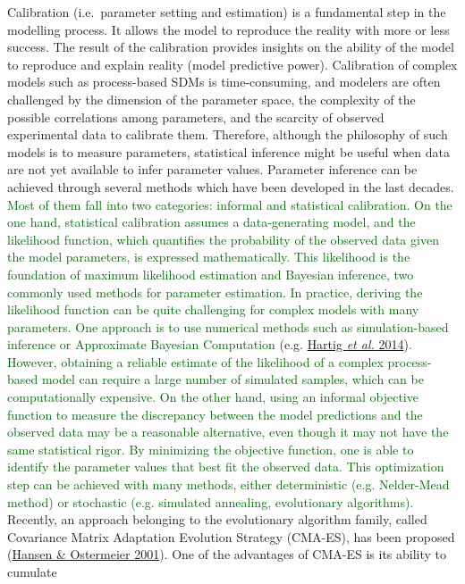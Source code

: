 \documentclass[11pt,]{article}
\begin{document}
Calibration (i.e.~parameter setting and estimation) is a fundamental
step in the modelling process. It allows the model to reproduce the
reality with more or less success. The result of the calibration
provides insights on the ability of the model to reproduce and explain
reality (model predictive power). Calibration of complex models such as
process-based SDMs is time-consuming, and modelers are often challenged
by the dimension of the parameter space, the complexity of the possible
correlations among parameters, and the scarcity of observed experimental
data to calibrate them. Therefore, although the philosophy of such
models is to measure parameters, statistical inference might be useful
when data are not yet available to infer parameter values. Parameter
inference can be achieved through several methods which have been
developed in the last decades.
\textcolor{darkgreen}{Most of them fall into two categories: informal and statistical calibration. On the one hand, statistical calibration assumes a data-generating model, and the likelihood function, which quantifies the probability of the observed data given the model parameters, is expressed mathematically. This likelihood is the foundation of maximum likelihood estimation and Bayesian inference, two commonly used methods for parameter estimation. In practice, deriving the likelihood function can be quite challenging for complex models with many parameters. One approach is to use numerical methods such as simulation-based inference or Approximate Bayesian Computation}
(e.g. \protect\hyperlink{ref-Hartig2014}{Hartig \emph{et al.}
2014})\textcolor{darkgreen}{. However, obtaining a reliable estimate of the likelihood of a complex process-based model can require a large number of simulated samples, which can be computationally expensive. On the other hand, using an informal objective function to measure the discrepancy between the model predictions and the observed data may be a reasonable alternative, even though it may not have the same statistical rigor. By minimizing the objective function, one is able to identify the parameter values that best fit the observed data. This optimization step can be achieved with many methods, either deterministic (e.g. Nelder-Mead method) or stochastic (e.g. simulated annealing, evolutionary algorithms).}\\
Recently, an approach belonging to the evolutionary algorithm family,
called Covariance Matrix Adaptation Evolution Strategy (CMA-ES), has
been proposed (\protect\hyperlink{ref-Hansen2001}{Hansen \& Ostermeier
2001}). One of the advantages of CMA-ES is its ability to cumulate
\end{document}
